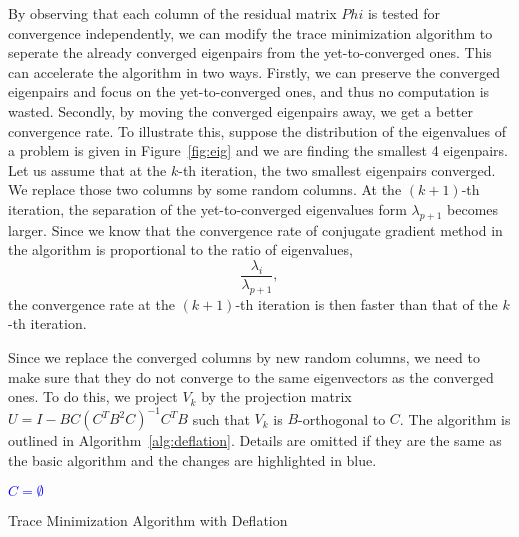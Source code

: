 By observing that each column of the residual matrix $Phi$ is tested for convergence independently, we can modify
the trace minimization algorithm to seperate the already converged eigenpairs from the yet-to-converged ones. This
can accelerate the algorithm in two ways. Firstly, we can preserve the converged eigenpairs and focus on the
yet-to-converged ones, and thus no computation is wasted. Secondly, by moving the converged eigenpairs away, we get
a better convergence rate. To illustrate this, suppose the distribution of the eigenvalues of a problem is given in
Figure~\ref{fig:eig} and we are finding the smallest 4 eigenpairs. Let us assume that at the $k$-th iteration, the
two smallest eigenpairs converged. We replace those two columns by some random columns. At the $(k + 1)$-th
iteration, the separation of the yet-to-converged eigenvalues form $\lambda_{p+1}$ becomes larger. Since we know
that the convergence rate of conjugate gradient method in the algorithm is proportional to the ratio of eigenvalues,
\begin{equation}
	\frac{\lambda_i}{\lambda_{p+1}},
\end{equation}
the convergence rate at the $(k + 1)$-th iteration is then faster than that of the $k$-th iteration.

Since we replace the converged columns by new random columns, we need to make sure that they do not converge to the
same eigenvectors as the converged ones. To do this, we project $V_k$ by the projection matrix
$U = I - B C \left(C^T B^2 C\right)^{-1}C^T B$ such that $V_k$ is $B$-orthogonal to $C$. The algorithm is outlined
in Algorithm~\ref{alg:deflation}. Details are omitted if they are the same as the basic algorithm and the changes are
highlighted in blue.

\begin{algorithm}[!ht]
	\SetArgSty{}
	\textcolor{blue}{$C = \emptyset$\;}
	\caption{Trace Minimization Algorithm with Deflation}\label{alg:deflation}
\end{algorithm}

